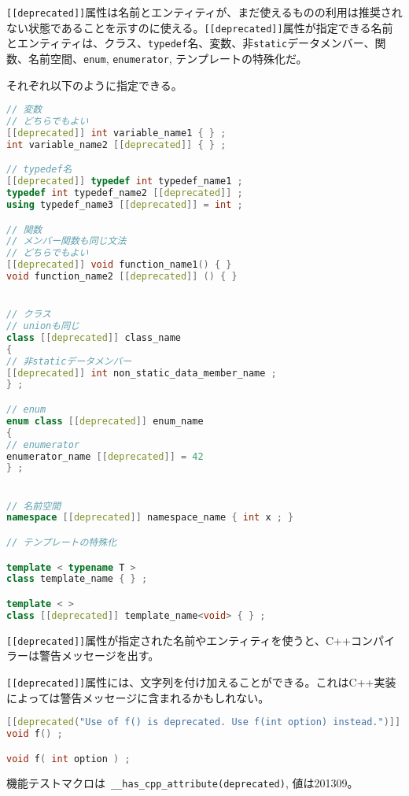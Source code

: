 %

\lstinline![[deprecated]]!属性は名前とエンティティが、まだ使えるものの利用は推奨されない状態であることを示すのに使える。\lstinline![[deprecated]]!属性が指定できる名前とエンティティは、クラス、\lstinline!typedef!名、変数、非\lstinline!static!データメンバー、関数、名前空間、\lstinline!enum!,
\lstinline!enumerator!, テンプレートの特殊化だ。

それぞれ以下のように指定できる。

\begin{lstlisting}[language=C++]
// 変数
// どちらでもよい
[[deprecated]] int variable_name1 { } ;
int variable_name2 [[deprecated]] { } ;

// typedef名
[[deprecated]] typedef int typedef_name1 ;
typedef int typedef_name2 [[deprecated]] ;
using typedef_name3 [[deprecated]] = int ;

// 関数
// メンバー関数も同じ文法
// どちらでもよい
[[deprecated]] void function_name1() { }
void function_name2 [[deprecated]] () { }


// クラス
// unionも同じ
class [[deprecated]] class_name
{
// 非staticデータメンバー
[[deprecated]] int non_static_data_member_name ;
} ;

// enum
enum class [[deprecated]] enum_name
{
// enumerator
enumerator_name [[deprecated]] = 42
} ;


// 名前空間
namespace [[deprecated]] namespace_name { int x ; }

// テンプレートの特殊化

template < typename T >
class template_name { } ;

template < >
class [[deprecated]] template_name<void> { } ;
\end{lstlisting}

\lstinline![[deprecated]]!属性が指定された名前やエンティティを使うと、C++コンパイラーは警告メッセージを出す。

\lstinline![[deprecated]]!属性には、文字列を付け加えることができる。これはC++実装によっては警告メッセージに含まれるかもしれない。

\begin{lstlisting}[language=C++]
[[deprecated("Use of f() is deprecated. Use f(int option) instead.")]]
void f() ;

void f( int option ) ;
\end{lstlisting}

機能テストマクロは~\lstinline!__has_cpp_attribute(deprecated)!,
値は201309。
